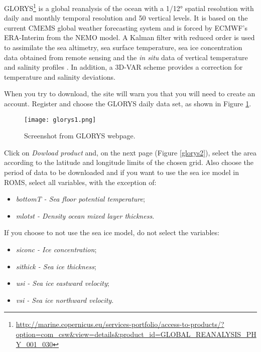\noindent GLORYS\textcolor{bleu_cite}{\textit{}\footnote{\textcolor{bleu_cite}{\href{http://marine.copernicus.eu/services-portfolio/access-to-products/?option=com\_csw\&view=details\&product\_id=GLOBAL\_REANALYSIS\_PHY\_001\_030}{http://marine.copernicus.eu/services-portfolio/access-to-products/?option=com\_csw\&view=details\&product\_id=GLOBAL\_REANALYSIS\_PHY\_001\_030}}}}
is a global reanalysis of the ocean with a 1/12° spatial resolution with daily and monthly temporal resolution and 
50 vertical levels. It is based on the current CMEMS global weather forecasting system and is forced by ECMWF's ERA-Interim from the NEMO model.
A Kalman filter with reduced order is used to assimilate the sea altimetry, sea surface temperature, sea ice concentration data obtained 
from remote sensing and the \textit{in situ} data of vertical temperature and salinity profiles .
In addition, a 3D-VAR scheme provides a correction for temperature and salinity deviations.
\bigskip

\noindent When you try to download, the site will warn you that you will need to create an account.
Register and choose the GLORYS daily data set, as shown in Figure \textcolor{bleu_cite}{\ref{glorys1}}.
\bigskip

\begin{figure}[H]
    \centering
    \texttt{[image: glorys1.png]}
    \caption{Screenshot from GLORYS webpage.}
    \label{glorys1}
\end{figure}
\bigskip

\noindent Click on \textit{Dowload product} and, on the next page (Figure \textcolor{bleu_cite}{\ref{glorys2}}), select the area according to 
the latitude and longitude limits of the chosen grid. Also choose the period of data to be downloaded and if you want to use the sea 
ice model in ROMS, select all variables, with the exception of:
\bigskip

\begin{itemize}
    \item \textit{ bottomT - Sea floor potential temperature};
    \item \textit{mlotst - Density ocean mixed layer thickness}.
\end{itemize}
\bigskip

\noindent If you choose to not use the sea ice model, do not select the variables:
\bigskip

\begin{itemize}
    \item \textit{siconc - Ice concentration};
    \item \textit{sithick - Sea ice thickness};
    \item \textit{usi - Sea ice eastward velocity};
    \item \textit{vsi - Sea ice northward velocity}.
\end{itemize}
\bigskip

